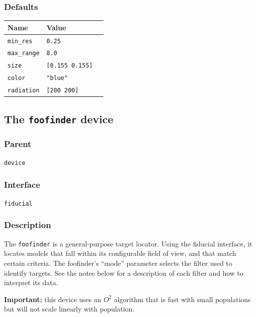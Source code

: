 \documentclass[11pt,twoside]{report}
\begin{document}
\subsubsection*{Defaults}
\begin{tabularx}{\columnwidth}{llX}
\hline
Name & Value\\
\hline
\verb'min_res' & \verb'0.25'\\
\verb'max_range' & \verb'8.0' \\
\verb'size' & \verb'[0.155 0.155]'\\
\verb'color' & \verb'"blue"' \\
\verb'radiation' & \verb'[200 200]' \\ 
\hline
\end{tabularx}


\newpage
\subsection{The {\tt foofinder} device}

\subsubsection*{Parent}
{\tt device}

\subsubsection*{Interface}
{\tt fiducial}

\subsubsection*{Description}

The \verb'foofinder' is a general-purpose target locator. Using the
fiducial interface, it locates models that fall within its
configurable field of view, and that match certain criteria. The
foofinder's ``mode'' parameter selects the filter used to identify
targets. See the notes below for a description of each filter and how
to interpret its data.

{\bf Important: } this device uses an $O^2$ algorithm that is fast
with small populations but will not scale linearly with population.
\end{document}
